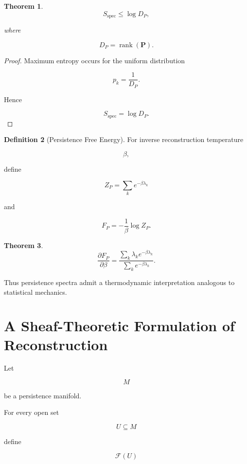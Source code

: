 \documentclass[12pt,oneside]{article}
\newtheorem{theorem}{Theorem}[section] \newtheorem{lemma}[theorem]{Lemma} \newtheorem{proposition}[theorem]{Proposition} \newtheorem{corollary}[theorem]{Corollary}
\theoremstyle{definition}
\newtheorem{definition}[theorem]{Definition} \newtheorem{axiom}[theorem]{Axiom} \newtheorem{remark}[theorem]{Remark} \newtheorem{example}[theorem]{Example}
\begin{document}
\begin{theorem}

\[
S_{\mathrm{spec}}
\le
\log D_P,
\]

where

\[
D_P
=
\operatorname{rank}(\mathbf P).
\]

\end{theorem}

\begin{proof}

Maximum entropy occurs for the uniform distribution

\[
p_k
=
\frac1{D_P}.
\]

Hence

\[
S_{\mathrm{spec}}
=
\log D_P.
\]

\end{proof}

\begin{definition}[Persistence Free Energy]

For inverse reconstruction temperature

\[
\beta,
\]

define

\[
Z_P
=
\sum_k
e^{-\beta\lambda_k}
\]

and

\[
F_P
=
-\frac1\beta
\log Z_P.
\]

\end{definition}

\begin{theorem}

\[
\frac{\partial F_P}
{\partial \beta}
=
\frac{
\sum_k
\lambda_k
e^{-\beta\lambda_k}
}{
\sum_k
e^{-\beta\lambda_k}
}.
\]

\end{theorem}

Thus persistence spectra admit a thermodynamic interpretation analogous to statistical mechanics.

\section{A Sheaf-Theoretic Formulation of Reconstruction}

Let

\[
M
\]

be a persistence manifold.

For every open set

\[
U\subseteq M
\]

define

\[
\mathcal F(U)
\]
\end{document}
